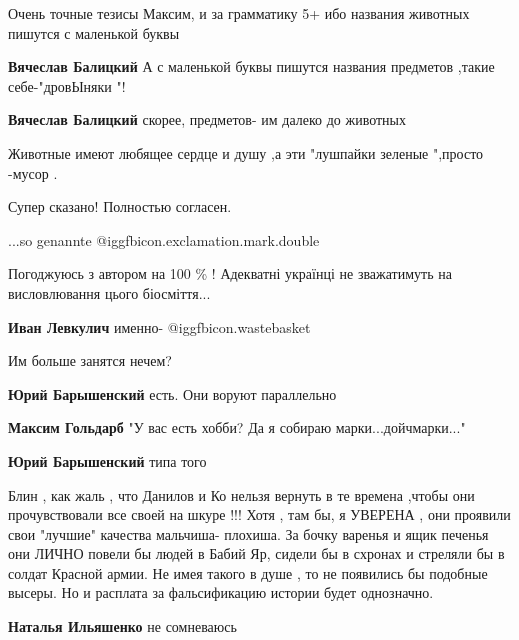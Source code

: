 \begin{itemize}
Очень точные тезисы Максим, и за грамматику 5+ ибо названия животных пишутся с маленькой буквы

\begin{itemize} %
\textbf{Вячеслав Балицкий} А с маленькой буквы пишутся названия предметов ,такие себе-"дровЫняки "!

\textbf{Вячеслав Балицкий} скорее, предметов- им далеко до животных

Животные имеют любящее сердце и душу ,а эти "лушпайки зеленые ",просто -мусор .
\end{itemize} %

Супер сказано! Полностью согласен.

...so genannte @igg{fbicon.exclamation.mark.double}


Погоджуюсь з автором на 100 \% ! Адекватні українці не зважатимуть на
висловлювання цього біосміття...

\begin{itemize} %
\textbf{Иван Левкулич} именно-  @igg{fbicon.wastebasket} 
\end{itemize} %

Им больше занятся нечем?

\begin{itemize} %
\textbf{Юрий Барышенский} есть. Они воруют параллельно

\textbf{Максим Гольдарб} "У вас есть хобби? Да я собираю марки...дойчмарки..."

\textbf{Юрий Барышенский} типа того
\end{itemize} %


Блин , как жаль , что Данилов и Ко нельзя вернуть в те времена ,чтобы они
прочувствовали все своей на шкуре !!! Хотя , там бы, я УВЕРЕНА , они проявили
свои "лучшие" качества мальчиша- плохиша. За бочку варенья и ящик печенья они
ЛИЧНО повели бы людей в Бабий Яр, сидели бы в схронах и стреляли бы в солдат
Красной армии. Не имея такого в душе , то не появились бы подобные высеры. Но и
расплата за фальсификацию истории будет однозначно.

\begin{itemize} %
\textbf{Наталья Ильяшенко} не сомневаюсь
\end{itemize} %


\end{itemize}
